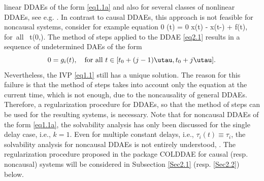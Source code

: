 \documentclass[final,reqno]{siamltex}
\begin{document}
linear DDAEs of the form \eqref{eq1.1a} and also for several classes of nonlinear DDAEs, see e.g. \cite{AscP95,BakPT02,GugH07,Hau97,ShaG06}.
In contrast to causal DDAEs, this approach is not feasible for noncausal systems,
consider for example equation 
%
\be\label{eq2.1}
  0 \cdot {}(t) = 0 \cdot x(t) - x(t-\tau) + f(t), \quad \mbox{for all } t\in (0,\infty).
\ee
%
The method of steps applied to the DDAE \eqref{eq2.1} results in a sequence of undetermined DAEs of the form
%
\[
 0 = g_i(t), \quad \mbox{for all } t \in [t_0+(j-1)\utau,t_0+j\utau]. 
\]
%
Nevertheless, the IVP \eqref{eq1.1} still has a unique solution. 
The reason for this failure is that the method of steps takes into account only the equation at the current time, which is not enough, 
due to the noncausality of general DDAEs. Therefore, a regularization procedure for DDAEs, so that the method of steps can be used for the resulting systems, is 
necessary. Note that for noncausal DDAEs of the form \eqref{eq1.1a}, the solvability analysis has only been discussed for 
the single delay case, i.e., $k=1$. Even for multiple constant delays, i.e., $\tau_i(t) \equiv \tau_i$, the solvability analysis for noncausal DDAEs 
is not entirely understood, \cite{HaM14,Ha15}. 
The regularization procedure proposed in the package COLDDAE for causal (resp. noncausal) systems will be considered in Subsection \ref{Sec2.1} (resp. \ref{Sec2.2}) below.
\end{document}
